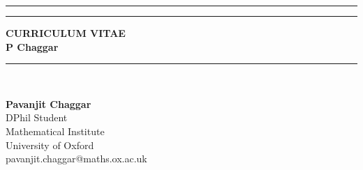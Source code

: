 \documentclass[11pt, a4paper]{article}
\begin{document}
\cfoot{}
\chead{}
\lfoot{}
\lhead{}
\rhead{}
\pagestyle{fancyplain}
\renewcommand{\headrulewidth}{0.0pt}
\begin{center}
\hrule depth 0.5pt
\vspace{3pt}
\hrule
\vspace{5pt}
\uppercase{\bfseries {\large C}urriculum vitae}\\
\textbf{P Chaggar}
\vspace{5pt}
\hrule depth 0.5pt
\vspace{3.0cm}~
\end{center}
\vspace{-3.0cm}

\textbf{Pavanjit Chaggar} \\
DPhil Student \\ Mathematical Institute \\ University of Oxford \\
pavanjit.chaggar@maths.ox.ac.uk \\

\vspace{-0.5cm}










% 
\end{document}
